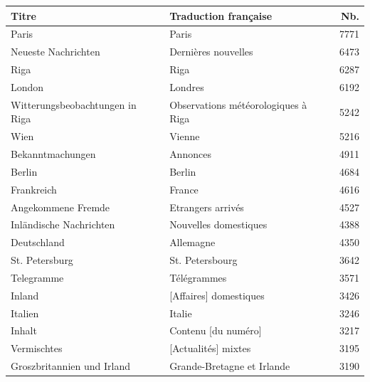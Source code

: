 \documentclass[a4paper,twoside,12pt]{article}
\begin{document}
\begin{table}[h]
    \centering
    \small
    \begin{tabular}{llr}
\toprule
                 \textbf{Titre} &         \textbf{Traduction française} & \textbf{Nb.} \\
\midrule
                          Paris &                                 Paris &      7771 \\
            Neueste Nachrichten &                   Dernières nouvelles &      6473 \\
                           Riga &                                  Riga &      6287 \\
                         London &                                Londres &      6192 \\
Witterungsbeobachtungen in Riga &   Observations météorologiques à Riga &      5242 \\
                           Wien &                                Vienne &      5216 \\
               Bekanntmachungen &                              Annonces &      4911 \\
                         Berlin &                                Berlin &      4684 \\
                     Frankreich &                                France &      4616 \\
             Angekommene Fremde &                     Etrangers arrivés &      4527 \\
        Inländische Nachrichten &                 Nouvelles domestiques &      4388 \\
                    Deutschland &                             Allemagne &      4350 \\
                 St. Petersburg &                       St. Petersbourg &      3642 \\
                     Telegramme &                           Télégrammes &      3571 \\
                         Inland &                [Affaires] domestiques &      3426 \\
                        Italien &                                Italie &      3246 \\
                         Inhalt &                   Contenu [du numéro] &      3217 \\
                    Vermischtes &                   [Actualités] mixtes &      3195 \\
     Groszbritannien und Irland &            Grande-Bretagne et Irlande &      3190 \\

\end{tabular}
\end{table}
\end{document}
